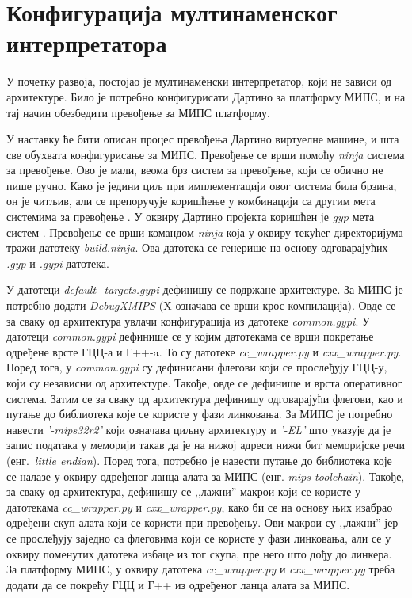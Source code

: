 \documentclass[12pt,oneside]{memoir}
\begin{document}
\section{Конфигурација мултинаменског интерпретатора}
\label{konfigurisanje}
У почетку развоја, постојао је мултинаменски интерпретатор, који не зависи од архитектуре. Било је потребно конфигурисати Дартино за платформу МИПС, и на тај начин обезбедити превођење за МИПС платформу. 

У наставку ће бити описан процес превођења Дартино виртуелне машине, и шта све обухвата конфигурисање за МИПС.
Превођење се врши помоћу \textit{ninja} система за превођење. Ово је мали, веома брз систем за превођење, који се обично не пише ручно. Како је једини циљ при имплементацији овог система била брзина, он је читљив, али се препоручује коришћење у комбинацији са другим мета системима за превођење \cite{ninja}. У оквиру Дартино пројекта коришћен је \textit{gyp} мета систем \cite{gyp}. Превођење се врши командом \textit{ninja} која у оквиру текућег директоријума тражи датотеку \textit{build.ninja}. Ова датотека се генерише на основу одговарајућих \textit{.gyp} и \textit{.gypi} датотека. 

У датотеци \textit{default\_targets.gypi} дефинишу се подржане архитектуре. За МИПС је потребно додати \textit{DebugXMIPS} (X-означава се врши крос-компилација). Овде се за сваку од архитектура увлачи конфигурација из датотеке \textit{common.gypi}. У датотеци \textit{common.gypi} дефинише се у којим датотекама се врши покретање одређене врсте ГЦЦ-а и Г++-a. То су датотеке \textit{cc\_wrapper.py} и \textit{cxx\_wrapper.py}. Поред тога, у \textit{common.gypi} су дефинисани флегови који се прослеђују ГЦЦ-у, који су независни од архитектуре. Такође, овде се дефинише и врста оперативног система. Затим се за сваку од архитектура дефинишу одговарајући флегови, као и путање до библиотека које се користе у фази линковања. За МИПС је потребно навести \textit{'-mips32r2'} који означава циљну архитектуру и \textit{'-EL'} што указује да је запис података у меморији такав да је на нижој адреси нижи бит меморијске речи (енг.~\textit{little endian}). Поред тога, потребно је навести путање до библиотека које се налазе у оквиру одређеног ланца алата за МИПС (енг. \textit{mips toolchain}). Такође, за сваку од архитектура, дефинишу се ,,лажни'' макрои који се користе у датотекама \textit{cc\_wrapper.py} и \textit{cxx\_wrapper.py}, како би се на основу њих изабрао одређени скуп алата који се користи при превођењу. Ови макрои су ,,лажни'' јер се прослеђују заједно са флеговима који се користе у фази линковања, али се у оквиру поменутих датотека избаце из тог скупа, пре него што дођу до линкера. За платформу МИПС, у оквиру датотека \textit{cc\_wrapper.py} и \textit{cxx\_wrapper.py} треба додати да се покрећу ГЦЦ и Г++ из одређеног ланца алата за МИПС.
\end{document}
